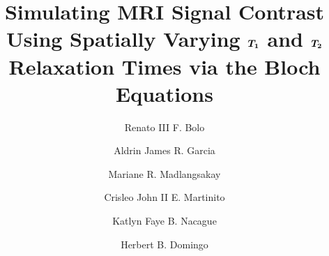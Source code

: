 \documentclass[10pt,a4paper,twoside]{article}
\begin{document}
\title{\TitleFont Simulating MRI Signal Contrast Using Spatially Varying $\vb*{T_1}$ and $\vb*{T_2}$ Relaxation Times via the Bloch Equations}




\author[a,*]{Renato III F. Bolo\authorsep}
\author[a]{Aldrin James R. Garcia\authorsep}
\author[a]{Mariane R. Madlangsakay\authorsep}
\author[a]{Crisleo John II E. Martinito\authorsep}
\author[a]{Katlyn Faye B. Nacague\authorsep}
\author[a]{Herbert B. Domingo\lastauthorsep}

\maketitle
\thispagestyle{titlestyle}
\end{document}
